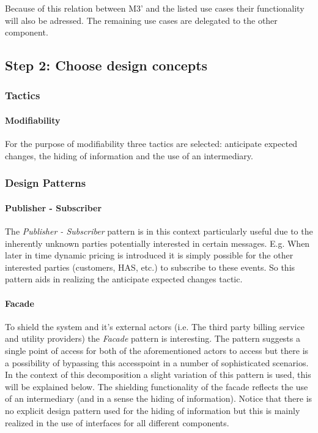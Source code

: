 \npar Because of this relation between M3' and the listed use cases their
functionality will also be adressed. The remaining use cases are delegated to
the other component. %

\subsection{Step 2: Choose design concepts}
\label{add:it9/concepts}

\subsubsection{Tactics}
\label{add:it9/tactics}

\paragraph{Modifiability}

\npar For the purpose of modifiability three tactics are selected: anticipate
expected changes, the hiding of information and the use of an intermediary.

\subsubsection{Design Patterns}
\label{add:it9/patterns}

\paragraph{Publisher - Subscriber}

\npar The \emph{Publisher - Subscriber} pattern is in this context particularly useful due to
the inherently unknown parties potentially interested in certain messages. E.g. When
later in time dynamic pricing is introduced it is simply possible for the other
interested parties (customers, HAS, etc.) to subscribe to these events. So this
pattern aids in realizing the anticipate expected changes tactic.

\paragraph{Facade}

\npar To shield the system and it's external actors (i.e. The third party
billing service and utility providers) the \emph{Facade} pattern is interesting.
The pattern suggests a single point of access for both of the aforementioned
actors to access but there is a possibility of bypassing this accesspoint in a
number of sophisticated scenarios. In the context of this decomposition a slight
variation of this pattern is used, this will be explained below. The shielding
functionality of the facade reflects the use of an intermediary (and in a sense
the hiding of information). Notice that there is no explicit design pattern used
for the hiding of information but this is mainly realized in the use of
interfaces for all different components.

